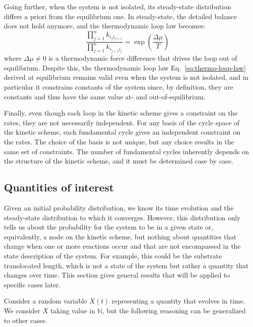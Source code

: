     Going further, when the system is not isolated, its steady-state distribution differs a priori from the equilibrium one. In steady-state, the detailed balance does not hold anymore, and the thermodynamic loop law becomes:
    \begin{equation}
        \frac{\prod_{j=1}^n k_{i_ji_{j+1}}}{\prod_{j=1}^n k_{i_{j+1}i_j}} 
        = \exp\left(\frac{\Delta\mu}{T}\right)
    \end{equation}
    where $\Delta\mu\neq 0$ is a thermodynamic force difference that drives the loop out of equilibrium. Despite this, the thermodynamic loop law Eq.~\eqref{eq:thermo-loop-law} derived at equilibrium remains valid even when the system is not isolated, and in particular it constrains constants of the system since, by definition, they are constants and thus have the same value at- and out-of-equilibrium.
    
    Finally, even though each loop in the kinetic scheme gives a constraint on the rates, they are not necessarily independent. For any basis of the cycle space of the kinetic scheme, each fundamental cycle gives an independent constraint on the rates. The choice of the basis is not unique, but any choice results in the same set of constraints. The number of fundamental cycles inherently depends on the structure of the kinetic scheme, and it must be determined case by case\cite{schnakenberg_network_1976}.

\subsection{Quantities of interest}
\label{subsec:quantities-of-interest}
    Given an initial probability distribution, we know its time evolution and the steady-state distribution to which it converges. However, this distribution only tells us about the probability for the system to be in a given state or, equivalently, a node on the kinetic scheme, but nothing about quantities that change when one or more reactions occur and that are not encompassed in the state description of the system. For example, this could be the substrate translocated length, which is not a state of the system but rather a quantity that changes over time. This section gives general results that will be applied to specific cases later.

    Consider a random variable $X(t)$ representing a quantity that evolves in time. We consider $X$ taking value in $\mathbb{N}$, but the following reasoning can be generalized to other cases. 
    
